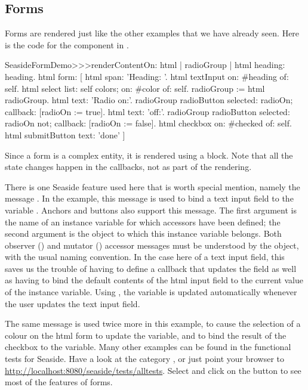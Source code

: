 \documentclass[a4paper,10pt,twoside]{book}
\begin{document}

\subsection{Forms}

Forms are rendered just like the other examples that we have already seen.
Here is the code for the  component in .

\begin{code}{}
SeasideFormDemo>>>renderContentOn: html
	| radioGroup |
	html heading: heading.
	html form: [
		html span: 'Heading: '.
		html textInput on: #heading of: self.
		html select
			list: self colors;
			on: #color of: self.
		radioGroup := html radioGroup.
		html text: 'Radio on:'.
		radioGroup radioButton
			selected: radioOn;
			callback: [radioOn := true].
		html text: 'off:'.
		radioGroup radioButton
			selected: radioOn not;
			callback: [radioOn := false].
		html checkbox on: #checked of: self.
		html submitButton
			text: 'done' ]
\end{code}{}

Since a form is a complex entity, it is rendered using a block.
Note that all the state changes happen in the callbacks, not as part of the rendering.

There is one Seaside feature used here that is worth special mention, namely the message .
In the example, this message is used to bind a text input field to the variable .
Anchors and buttons also support this message.
The first argument is the name of an instance variable for which accessors have been defined;  the second argument is the object to which this instance variable belongs.
Both observer () and mutator () accessor messages must be understood by the object, with the usual naming convention.
In the case here of a text input field, this saves us the trouble of having to define a callback that updates the field as well as having to bind the default contents of the html input field to the current value of the instance variable.
Using , the  variable is updated automatically whenever the user updates the text input field.

The same message is used twice more in this example, to cause the selection of a colour on the html form to update the  variable, and to bind the result of the checkbox to the  variable.
Many other examples can be found in the functional tests for Seaside.
Have a look at the category , or just point your browser to \url{http://localhost:8080/seaside/tests/alltests}.
Select  and click on the  button to see most of the features of forms.
\end{document}
